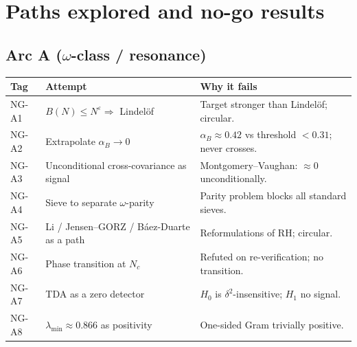 \documentclass[11pt]{article}
\theoremstyle{remark}
\begin{document}
\section{Paths explored and no-go results}

\subsection{Arc A ($\omega$-class / resonance)}
\begin{longtable}{l p{5.4cm} p{6.4cm}}
\toprule \textbf{Tag} & \textbf{Attempt} & \textbf{Why it fails} \\ \midrule \endhead
NG-A1 & $B(N)\le N^\varepsilon\Rightarrow$ Lindel\"of & Target stronger than Lindel\"of; circular. \\
NG-A2 & Extrapolate $\alpha_B\to0$ & $\alpha_B\approx0.42$ vs threshold $<0.31$; never crosses. \\
NG-A3 & Unconditional cross-covariance as signal & Montgomery--Vaughan: $\approx0$ unconditionally. \\
NG-A4 & Sieve to separate $\omega$-parity & Parity problem blocks all standard sieves. \\
NG-A5 & Li / Jensen--GORZ / B\'aez-Duarte as a path & Reformulations of RH; circular. \\
NG-A6 & Phase transition at $N_c$ & Refuted on re-verification; no transition. \\
NG-A7 & TDA as a zero detector & $H_0$ is $\delta^2$-insensitive; $H_1$ no signal. \\
NG-A8 & $\lambda_{\min}\approx0.866$ as positivity & One-sided Gram trivially positive. \\
\bottomrule
\end{longtable}
\end{document}
